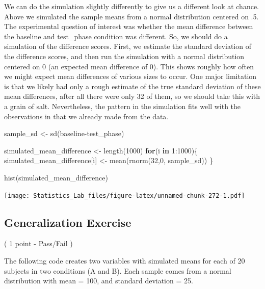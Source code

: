 \documentclass[
]{book}
\newenvironment{Shaded}{\begin{snugshade}}{\end{snugshade}}
\newcommand{\ControlFlowTok}[1]{\textcolor[rgb]{0.13,0.29,0.53}{\textbf{#1}}}
\newcommand{\DecValTok}[1]{\textcolor[rgb]{0.00,0.00,0.81}{#1}}
\newcommand{\FunctionTok}[1]{\textcolor[rgb]{0.00,0.00,0.00}{#1}}
\newcommand{\NormalTok}[1]{#1}
\newcommand{\OtherTok}[1]{\textcolor[rgb]{0.56,0.35,0.01}{#1}}
\newcommand{\SpecialCharTok}[1]{\textcolor[rgb]{0.00,0.00,0.00}{#1}}
\begin{document}
We can do the simulation slightly differently to give us a different look at chance. Above we simulated the sample means from a normal distribution centered on .5. The experimental question of interest was whether the mean difference between the baseline and test\_phase condition was different. So, we should do a simulation of the difference scores. First, we estimate the standard deviation of the difference scores, and then run the simulation with a normal distribution centered on 0 (an expected mean difference of 0). This shows roughly how often we might expect mean differences of various sizes to occur. One major limitation is that we likely had only a rough estimate of the true standard deviation of these mean differences, after all there were only 32 of them, so we should take this with a grain of salt. Nevertheless, the pattern in the simulation fits well with the observations in that we already made from the data.

\begin{Shaded}
\begin{Highlighting}[]
\NormalTok{sample\_sd   }\OtherTok{\textless{}{-}} \FunctionTok{sd}\NormalTok{(baseline}\SpecialCharTok{{-}}\NormalTok{test\_phase)}

\NormalTok{simulated\_mean\_difference }\OtherTok{\textless{}{-}} \FunctionTok{length}\NormalTok{(}\DecValTok{1000}\NormalTok{)}
\ControlFlowTok{for}\NormalTok{(i }\ControlFlowTok{in} \DecValTok{1}\SpecialCharTok{:}\DecValTok{1000}\NormalTok{)\{}
\NormalTok{ simulated\_mean\_difference[i] }\OtherTok{\textless{}{-}} \FunctionTok{mean}\NormalTok{(}\FunctionTok{rnorm}\NormalTok{(}\DecValTok{32}\NormalTok{,}\DecValTok{0}\NormalTok{, sample\_sd))}
\NormalTok{\}}

\FunctionTok{hist}\NormalTok{(simulated\_mean\_difference)}
\end{Highlighting}
\end{Shaded}

\texttt{[image: Statistics\_Lab\_files/figure-latex/unnamed-chunk-272-1.pdf]}

\hypertarget{generalization-exercise-5}{%
\subsection{Generalization Exercise}\label{generalization-exercise-5}}

( 1 point - Pass/Fail )

The following code creates two variables with simulated means for each of 20 subjects in two conditions (A and B). Each sample comes from a normal distribution with mean = 100, and standard deviation = 25.
\end{document}
